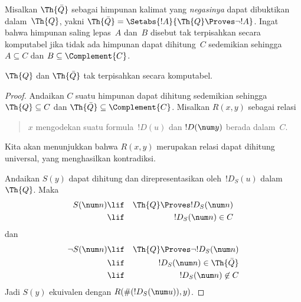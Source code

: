 \documentclass[../../../include/open-logic-section]{subfiles}
\begin{document}



Misalkan $\Th{\bar Q}$ sebagai himpunan kalimat yang {\em negasinya} dapat
dibuktikan dalam~$\Th{Q}$, yakni $\Th{\bar Q} = \Setabs{!A}{\Th{Q} \Proves
  \lnot !A}$. Ingat bahwa himpunan saling lepas~$A$ dan~$B$ disebut tak
terpisahkan secara komputabel jika tidak ada himpunan dapat dihitung~$C$
sedemikian sehingga $A \subseteq C$ dan $B \subseteq \Complement{C}$.

\begin{lem}
$\Th{Q}$ dan $\Th{\bar Q}$ tak terpisahkan secara komputabel.
\end{lem}

\begin{proof}
Andaikan $C$ suatu himpunan dapat dihitung sedemikian sehingga $\Th{Q}
\subseteq C$ dan $\Th{\bar Q} \subseteq \Complement{C}$. Misalkan $R(x,y)$
sebagai relasi
\begin{quote}
$x$ mengodekan suatu formula~$!D(u)$ dan $!D(\num y)$ berada dalam~$C$.
\end{quote}
Kita akan menunjukkan bahwa $R(x,y)$ merupakan relasi dapat dihitung
universal, yang menghasilkan kontradiksi.

Andaikan $S(y)$ dapat dihitung dan direpresentasikan oleh~$!D_S(u)$
dalam~$\Th{Q}$. Maka
\begin{eqnarray*}
S(\num n) & \lif & \Th{Q} \Proves !D_S(\num n) \\
& \lif & !D_S(\num n) \in C
\end{eqnarray*}
dan
\begin{eqnarray*}
\lnot S(\num n) & \lif & \Th{Q} \Proves \lnot !D_S(\num n) \\
& \lif & !D_S(\num n) \in \Th{\bar Q} \\
& \lif & !D_S(\num n) \not\in C
\end{eqnarray*}
Jadi $S(y)$ ekuivalen dengan $R(\#(!D_S(\num u)),y)$.
\end{proof}
\end{document}
